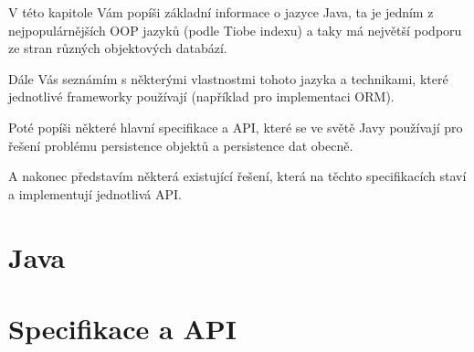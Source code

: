 V této kapitole Vám popíši základní informace o jazyce Java, ta je jedním z nejpopulárnějších OOP jazyků (podle Tiobe indexu) a taky má největší podporu ze stran různých objektových databází.

Dále Vás seznámím s některými vlastnostmi tohoto jazyka a technikami, které jednotlivé frameworky používají (například pro implementaci ORM).

Poté popíši některé hlavní specifikace a API, které se ve světě Javy používají pro řešení problému persistence objektů a persistence dat obecně. 

A nakonec představím některá existující řešení, která na těchto specifikacích staví a implementují jednotlivá API.
\section{Java}

\section{Specifikace a API}

